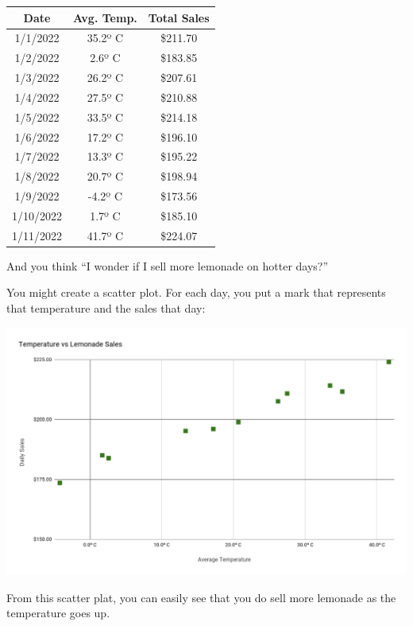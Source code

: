 \begin{tabular}{c | c | c}
  Date &	Avg. Temp. &	Total Sales \\
  \hline
  1/1/2022&35.2º C&\$211.70 \\
1/2/2022&2.6º C&\$183.85 \\
1/3/2022&26.2º C&\$207.61\\
1/4/2022&27.5º C&\$210.88\\
1/5/2022&33.5º C&\$214.18\\
1/6/2022&17.2º C&\$196.10\\
1/7/2022&13.3º C&\$195.22\\
1/8/2022&20.7º C&\$198.94\\
1/9/2022&-4.2º C&\$173.56\\
1/10/2022&1.7º C&\$185.10\\
1/11/2022&41.7º C&\$224.07\\
\end{tabular}

And you think ``I wonder if I sell more lemonade on hotter days?''

You might create a scatter plot.  For each day, you put a mark that
represents that temperature and the sales that day:

\includegraphics[width=\textwidth]{LemonadeScatter.png}

From this scatter plat, you can easily see that you do sell more
lemonade as the temperature goes up.




